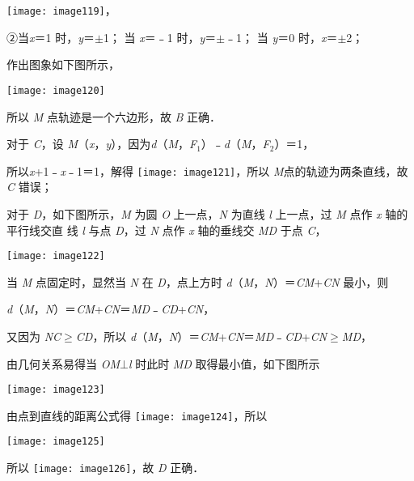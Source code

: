 \documentclass[a4paper,11pt,UTF8,twoside]{ctexart} %
\begin{document}
\texttt{[image: image119]}，

②当\textit{x}＝1 时，\textit{y}＝$\mathrm{\pm}$1； 当 \textit{x}＝﹣1 时，\textit{y}＝$\mathrm{\pm}$﹣1； 当 \textit{y}＝0 时，\textit{x}＝$\mathrm{\pm}$2；

作出图象如下图所示，

\texttt{[image: image120]}

所以 \textit{M} 点轨迹是一个六边形，故 \textit{B} 正确．

对于 \textit{C}，设 \textit{M}（\textit{x}，\textit{y}），因为{\textbar}\textit{d}（\textit{M}，\textit{F}${}_{1}$）﹣\textit{d}（\textit{M}，\textit{F}${}_{2}$）{\textbar}＝1，

所以{\textbar}\textit{x}+1{\textbar}﹣{\textbar}\textit{x}﹣1{\textbar}＝1，解得 \texttt{[image: image121]}，所以 \textit{M}点的轨迹为两条直线，故 \textit{C} 错误；

对于 \textit{D}，如下图所示，\textit{M} 为圆 \textit{O} 上一点，\textit{N} 为直线 \textit{l} 上一点，过 \textit{M} 点作 \textit{x} 轴的平行线交直 线 \textit{l} 与点 \textit{D}，过 \textit{N} 点作 \textit{x} 轴的垂线交 \textit{MD} 于点 \textit{C}，

\texttt{[image: image122]}

当 \textit{M} 点固定时，显然当 \textit{N} 在 \textit{D}，点上方时 \textit{d}（\textit{M}，\textit{N}）＝\textit{CM}+\textit{CN} 最小，则

\textit{d}（\textit{M}，\textit{N}）＝\textit{CM}+\textit{CN}＝\textit{MD}﹣\textit{CD}+\textit{CN}，

又因为 \textit{NC}$\mathrm{\geqslant}$\textit{CD}，所以 \textit{d}（\textit{M}，\textit{N}）＝\textit{CM}+\textit{CN}＝\textit{MD}﹣\textit{CD}+\textit{CN}$\mathrm{\geqslant}$\textit{MD}，

由几何关系易得当 \textit{OM}$\mathrm{\bot}$\textit{l} 时此时 \textit{MD} 取得最小值，如下图所示

\texttt{[image: image123]}

由点到直线的距离公式得 \texttt{[image: image124]}，所以

\texttt{[image: image125]}

所以 \texttt{[image: image126]}，故 \textit{D} 正确．
\end{document}
